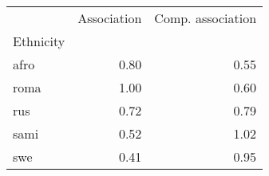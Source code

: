\begin{tabular}{lrr}
\toprule
{} &  Association &  Comp. association \\
Ethnicity &              &                    \\
\midrule
afro      &         0.80 &               0.55 \\
roma      &         1.00 &               0.60 \\
rus       &         0.72 &               0.79 \\
sami      &         0.52 &               1.02 \\
swe       &         0.41 &               0.95 \\
\bottomrule
\end{tabular}
